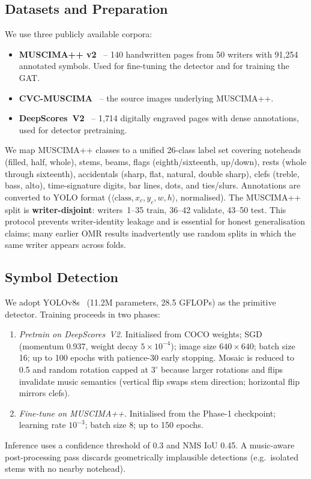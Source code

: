 \documentclass[conference]{IEEEtran}
\begin{document}
\subsection{Datasets and Preparation}\label{sec:data}
We use three publicly available corpora:
\begin{itemize}
    \item \textbf{MUSCIMA++ v2}~\cite{hajic2017muscima} -- 140 handwritten
    pages from 50 writers with 91{,}254 annotated symbols. Used for fine-tuning
    the detector and for training the GAT.
    \item \textbf{CVC-MUSCIMA}~\cite{fornes2012cvcmuscima} -- the source
    images underlying MUSCIMA++.
    \item \textbf{DeepScores~V2}~\cite{tuggener2024deepscores2} -- 1{,}714
    digitally engraved pages with dense annotations, used for detector
    pretraining.
\end{itemize}
We map MUSCIMA++ classes to a unified 26-class label set covering noteheads
(filled, half, whole), stems, beams, flags (eighth/sixteenth, up/down), rests
(whole through sixteenth), accidentals (sharp, flat, natural, double sharp),
clefs (treble, bass, alto), time-signature digits, bar lines, dots, and
ties/slurs. Annotations are converted to YOLO format
($\langle\text{class},x_c,y_c,w,h\rangle$, normalised). The MUSCIMA++ split
is \textbf{writer-disjoint}: writers~1--35 train, 36--42 validate, 43--50
test. This protocol prevents writer-identity leakage and is essential for
honest generalisation claims; many earlier OMR results inadvertently use
random splits in which the same writer appears across folds.

\subsection{Symbol Detection}\label{sec:detection}
We adopt YOLOv8s~\cite{jocher2023yolov8} (11.2M parameters, 28.5 GFLOPs) as the
primitive detector. Training proceeds in two phases:
\begin{enumerate}
    \item \emph{Pretrain on DeepScores~V2.} Initialised from COCO weights;
    SGD (momentum 0.937, weight decay $5\times 10^{-4}$); image size
    $640\times 640$; batch size 16; up to 100 epochs with patience-30 early
    stopping. Mosaic is reduced to 0.5 and random rotation capped at $3^\circ$
    because larger rotations and flips invalidate music semantics
    (vertical flip swaps stem direction; horizontal flip mirrors clefs).
    \item \emph{Fine-tune on MUSCIMA++.} Initialised from the Phase-1
    checkpoint; learning rate $10^{-3}$; batch size 8; up to 150 epochs.
\end{enumerate}
Inference uses a confidence threshold of 0.3 and NMS IoU 0.45. A music-aware
post-processing pass discards geometrically implausible detections (e.g.\
isolated stems with no nearby notehead).
\end{document}
